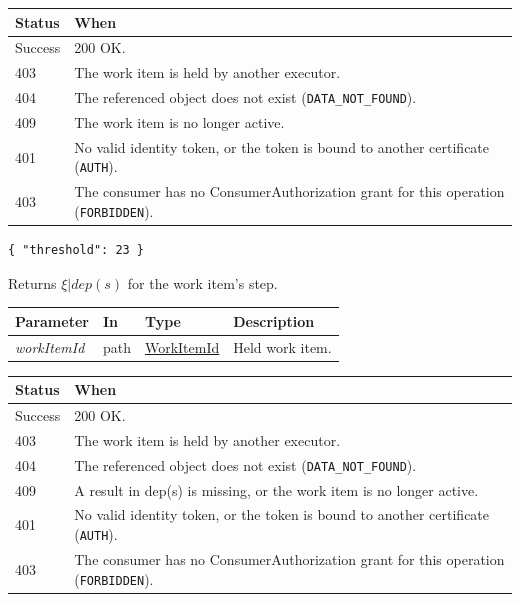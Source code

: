 \documentclass[a4paper]{arrowhead}
\newcommand{\fparam}[1]{\textit{\textcolor{ArrowheadBlue}{#1}}}
\newcommand{\pref}[1]{{\textcolor{ArrowheadGrey}{\hyperref[sec:model:primitives:#1]{#1}}}}
\begin{document}
{\small
\begin{longtable}{|p{2.0cm}|p{13.8cm}|}

\hline
\rowcolor{gray!33} Status & When \\ \hline
\endhead
Success & 200 OK. \\ \hline
403 & The work item is held by another executor. \\ \hline
404 & The referenced object does not exist (\texttt{DATA\_\allowbreak{}NOT\_\allowbreak{}FOUND}). \\ \hline
409 & The work item is no longer active. \\ \hline
401 & No valid identity token, or the token is bound to another certificate (\texttt{AUTH}). \\ \hline
403 & The consumer has no ConsumerAuthorization grant for this operation (\texttt{FORBIDDEN}). \\ \hline
\end{longtable}
}


\begin{lstlisting}[caption={Example response body}]
{ "threshold": 23 }
\end{lstlisting}

Returns $\xi|dep(s)$ for the work item's step.

{\small
\begin{longtable}{|p{3.0cm}|p{1.4cm}|p{3.2cm}|p{8.2cm}|}

\hline
\rowcolor{gray!33} Parameter & In & Type & Description \\ \hline
\endhead
\fparam{workItemId} & path & \pref{WorkItemId} & Held work item. \\ \hline
\end{longtable}
}


{\small
\begin{longtable}{|p{2.0cm}|p{13.8cm}|}

\hline
\rowcolor{gray!33} Status & When \\ \hline
\endhead
Success & 200 OK. \\ \hline
403 & The work item is held by another executor. \\ \hline
404 & The referenced object does not exist (\texttt{DATA\_\allowbreak{}NOT\_\allowbreak{}FOUND}). \\ \hline
409 & A result in dep(s) is missing, or the work item is no longer active. \\ \hline
401 & No valid identity token, or the token is bound to another certificate (\texttt{AUTH}). \\ \hline
403 & The consumer has no ConsumerAuthorization grant for this operation (\texttt{FORBIDDEN}). \\ \hline
\end{longtable}
}
\end{document}
